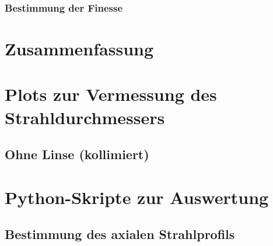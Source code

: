 \documentclass[11pt,a4paper,oneside]{scrartcl}
\begin{document}
\subsubsection{Bestimmung der Finesse}

\section{Zusammenfassung}
\newpage

 

\appendix


\section{Plots zur Vermessung des Strahldurchmessers}
\subsection{Ohne Linse (kollimiert)}

\section{Python-Skripte zur Auswertung}
\subsection{Bestimmung des axialen Strahlprofils}
%
\end{document}
